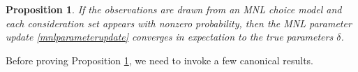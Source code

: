 \documentclass[preprint,12pt,authoryear]{elsarticle}
\newtheorem{proposition}{Proposition}
\begin{document}
\begin{proposition}\label{mnlupdateconverges}If the observations are drawn from an MNL choice model and each consideration set appears with nonzero probability, then the MNL parameter update \eqref{mnlparameterupdate} converges in expectation to the true parameters $\delta$. 
\end{proposition}


Before proving Proposition \ref{mnlupdateconverges}, we need to invoke a few canonical results.
\end{document}
